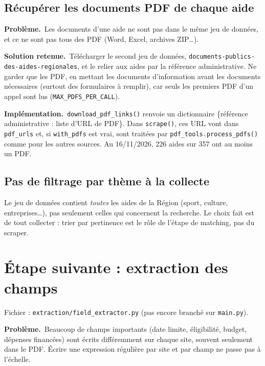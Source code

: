 \documentclass[11pt,a4paper]{article}
\newcommand{\pb}{\par\medskip\noindent\textbf{\textcolor{pbcolor}{Problème.}}\ }
\newcommand{\sol}{\par\medskip\noindent\textbf{\textcolor{solcolor}{Solution retenue.}}\ }
\newcommand{\impl}{\par\medskip\noindent\textbf{\textcolor{implcolor}{Implémentation.}}\ }
\newcommand{\code}[1]{\texttt{#1}}
\begin{document}
\subsection{Récupérer les documents PDF de chaque aide}

\pb Les documents d'une aide ne sont pas dans le même jeu de données, et ce ne sont pas
tous des PDF (Word, Excel, archives ZIP\dots).

\sol Télécharger le second jeu de données, \code{documents-publics-des-aides-regionales},
et le relier aux aides par la référence administrative. Ne garder que les PDF, en mettant
les \og documents d'information \fg{} avant les \og documents nécessaires \fg{} (surtout des
formulaires à remplir), car seuls les premiers PDF d'un appel sont lus
(\code{MAX\_PDFS\_PER\_CALL}).

\impl \code{download\_pdf\_links()} renvoie un dictionnaire
\{référence administrative : liste d'URL de PDF\}. Dans \code{scrape()}, ces URL vont dans
\code{pdf\_urls} et, si \code{with\_pdfs} est vrai, sont traitées par
\code{pdf\_tools.process\_pdfs()} comme pour les autres sources. Au 16/11/2026, 226 aides
sur 357 ont au moins un PDF.

\subsection{Pas de filtrage par thème à la collecte}

Le jeu de données contient \emph{toutes} les aides de la Région (sport, culture,
entreprises\dots), pas seulement celles qui concernent la recherche. Le choix fait est de
tout collecter : trier par pertinence est le rôle de l'étape de matching, pas du scraper.

\section{Étape suivante : extraction des champs}
\label{sec:extraction}

Fichier : \code{extraction/field\_extractor.py} (pas encore branché sur \code{main.py}).

\pb Beaucoup de champs importants (date limite, éligibilité, budget, dépenses financées)
sont écrits différemment sur chaque site, souvent seulement dans le PDF. Écrire une
expression régulière par site et par champ ne passe pas à l'échelle.
\end{document}
